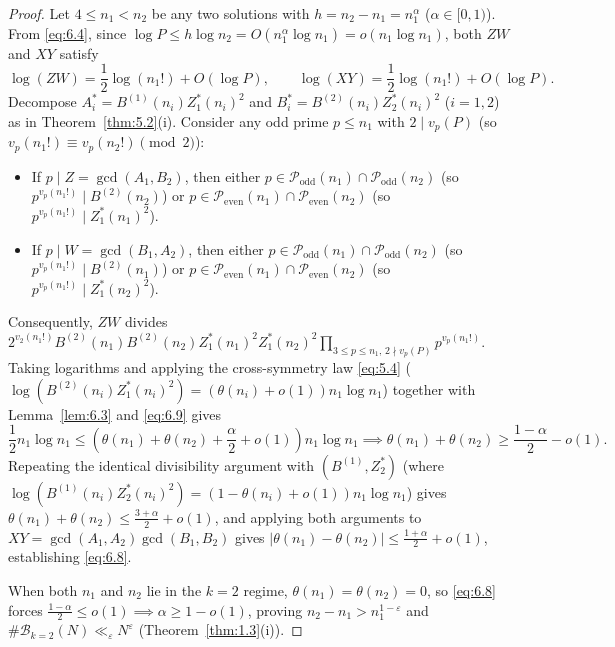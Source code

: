\documentclass[11pt,reqno]{amsart}
\theoremstyle{remark}
\numberwithin{equation}{section}
\newcommand{\Podd}{\mathcal{P}_{\mathrm{odd}}}
\newcommand{\Peven}{\mathcal{P}_{\mathrm{even}}}
\begin{document}
\begin{proof}
Let $4 \le n_1 < n_2$ be any two solutions with $h = n_2 - n_1 = n_1^\alpha$ ($\alpha \in [0, 1)$). From \eqref{eq:6.4}, since $\log P \le h\log n_2 = O(n_1^\alpha\log n_1) = o(n_1\log n_1)$, both $ZW$ and $XY$ satisfy
\begin{equation}\label{eq:6.9}
\log(ZW) = \frac{1}{2}\log(n_1!) + O(\log P), \qquad \log(XY) = \frac{1}{2}\log(n_1!) + O(\log P).
\end{equation}
Decompose $A_i^* = B^{(1)}(n_i)Z_1^*(n_i)^2$ and $B_i^* = B^{(2)}(n_i)Z_2^*(n_i)^2$ ($i = 1, 2$) as in Theorem~\ref{thm:5.2}(i). Consider any odd prime $p \le n_1$ with $2 \mid v_p(P)$ (so $v_p(n_1!) \equiv v_p(n_2!) \pmod 2$):
\begin{itemize}
\item If $p \mid Z = \gcd(A_1, B_2)$, then either $p \in \Podd(n_1) \cap \Podd(n_2)$ (so $p^{v_p(n_1!)} \mid B^{(2)}(n_2)$) or $p \in \Peven(n_1) \cap \Peven(n_2)$ (so $p^{v_p(n_1!)} \mid Z_1^*(n_1)^2$).
\item If $p \mid W = \gcd(B_1, A_2)$, then either $p \in \Podd(n_1) \cap \Podd(n_2)$ (so $p^{v_p(n_1!)} \mid B^{(2)}(n_1)$) or $p \in \Peven(n_1) \cap \Peven(n_2)$ (so $p^{v_p(n_1!)} \mid Z_1^*(n_2)^2$).
\end{itemize}
Consequently, $ZW$ divides $2^{v_2(n_1!)} B^{(2)}(n_1)B^{(2)}(n_2)Z_1^*(n_1)^2 Z_1^*(n_2)^2 \prod_{3 \le p \le n_1,\, 2 \nmid v_p(P)} p^{v_p(n_1!)}$. Taking logarithms and applying the cross-symmetry law \eqref{eq:5.4} ($\log(B^{(2)}(n_i)Z_1^*(n_i)^2) = (\theta(n_i) + o(1))n_1\log n_1$) together with Lemma~\ref{lem:6.3} and \eqref{eq:6.9} gives
\[
\frac{1}{2}n_1\log n_1 \le \left(\theta(n_1) + \theta(n_2) + \frac{\alpha}{2} + o(1)\right)n_1\log n_1 \implies \theta(n_1) + \theta(n_2) \ge \frac{1 - \alpha}{2} - o(1).
\]
Repeating the identical divisibility argument with $(B^{(1)}, Z_2^*)$ (where $\log(B^{(1)}(n_i)Z_2^*(n_i)^2) = (1 - \theta(n_i) + o(1))n_1\log n_1$) gives $\theta(n_1) + \theta(n_2) \le \frac{3+\alpha}{2} + o(1)$, and applying both arguments to $XY = \gcd(A_1, A_2)\gcd(B_1, B_2)$ gives $|\theta(n_1) - \theta(n_2)| \le \frac{1+\alpha}{2} + o(1)$, establishing \eqref{eq:6.8}.

When both $n_1$ and $n_2$ lie in the $k = 2$ regime, $\theta(n_1) = \theta(n_2) = 0$, so \eqref{eq:6.8} forces $\frac{1-\alpha}{2} \le o(1) \implies \alpha \ge 1 - o(1)$, proving $n_2 - n_1 > n_1^{1-\varepsilon}$ and $\#\mathcal{B}_{k=2}(N) \ll_\varepsilon N^\varepsilon$ (Theorem~\ref{thm:1.3}(i)).


\end{proof}
\end{document}
